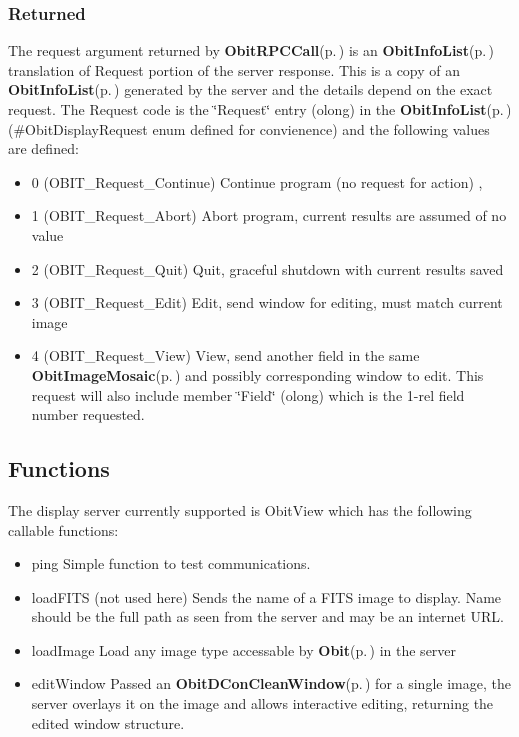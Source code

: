 \subsubsection{Returned}\label{ObitDisplay_8h_Request}
The request argument returned by {\bf Obit\-RPCCall}{\rm (p.\,\pageref{ObitRPC_8c_a11})} is an {\bf Obit\-Info\-List}{\rm (p.\,\pageref{structObitInfoList})} translation of Request portion of the server response. This is a copy of an {\bf Obit\-Info\-List}{\rm (p.\,\pageref{structObitInfoList})} generated by the server and the details depend on the exact request. The Request code is the \char`\"{}Request\char`\"{} entry (olong) in the {\bf Obit\-Info\-List}{\rm (p.\,\pageref{structObitInfoList})}(\#Obit\-Display\-Request enum defined for convienence) and the following values are defined: \begin{itemize}
\item 0 (OBIT\_\-Request\_\-Continue) Continue program (no request for action) , \item 1 (OBIT\_\-Request\_\-Abort) Abort program, current results are assumed of no value \item 2 (OBIT\_\-Request\_\-Quit) Quit, graceful shutdown with current results saved \item 3 (OBIT\_\-Request\_\-Edit) Edit, send window for editing, must match current image \item 4 (OBIT\_\-Request\_\-View) View, send another field in the same {\bf Obit\-Image\-Mosaic}{\rm (p.\,\pageref{structObitImageMosaic})} and possibly corresponding window to edit. This request will also include member \char`\"{}Field\char`\"{} (olong) which is the 1-rel field number requested.\end{itemize}
\subsection{Functions}\label{ObitDisplay_8h_Server}
The display server currently supported is Obit\-View which has the following callable functions: \begin{itemize}
\item ping Simple function to test communications. \item load\-FITS (not used here) Sends the name of a FITS image to display. Name should be the full path as seen from the server and may be an internet URL. \item load\-Image Load any image type accessable by {\bf Obit}{\rm (p.\,\pageref{structObit})} in the server \item edit\-Window Passed an {\bf Obit\-DCon\-Clean\-Window}{\rm (p.\,\pageref{structObitDConCleanWindow})} for a single image, the server overlays it on the image and allows interactive editing, returning the edited window structure.\end{itemize}
